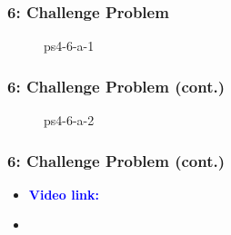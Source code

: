 \documentclass[../report.tex]{subfiles}
\begin{document}
    
    \begin{frame}
        \frametitle{6: Challenge Problem}
        \begin{figure}[!htb]
            \centering
            \caption{ps4-6-a-1}
        \end{figure}
    \end{frame}

    \begin{frame}
        \frametitle{6: Challenge Problem (cont.)}
        \begin{figure}[!htb]
            \centering
            \caption{ps4-6-a-2}
        \end{figure}
    \end{frame}

    \begin{frame}[t]
        \frametitle{6: Challenge Problem (cont.)}
        \begin{normalsize}
            \begin{itemize}
                \setlength\itemsep{1em}\fontsize{6pt}{6pt}

                \item[]{\textbf{\selectfont\textcolor{blue}{ Video link: }}}
                
                \item[]\textbf{}
            \end{itemize}
        \end{normalsize}
    \end{frame}
\end{document}
